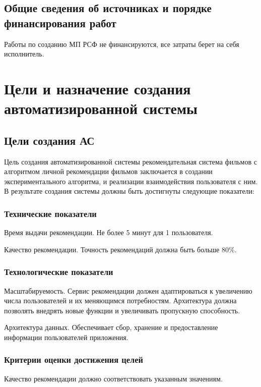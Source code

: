 \subsection{Общие сведения об источниках и порядке финансирования работ}

Работы по созданию МП РСФ не финансируются, все затраты берет на себя исполнитель.

\section{Цели и назначение создания автоматизированной системы}

\subsection{Цели создания АС}

Цель создания автоматизированной системы рекомендательная система фильмов с алгоритмом личной рекомендации фильмов
заключается в создании экспериментального алгоритма, и реализации взаимодействия пользователя с ним.
В результате создания системы должны быть достигнуты следующие показатели:

\subsubsection{Технические показатели}

Время выдачи рекомендации.
Не более 5 минут для 1 пользователя.

Качество рекомендации.
Точность рекомендаций должна быть больше 80\%.


\subsubsection{Технологические показатели}

Масштабируемость.
Сервис рекомендации должен адаптироваться к увеличению числа пользователей и их меняющимся потребностям.
Архитектура должна позволять внедрять новые функции и увеличивать пропускную способность.

Архитектура данных.
Обеспечивает сбор, хранение и предоставление информации пользователей приложения.


\subsubsection{Критерии оценки достижения целей}

Качество рекомендации должно соответствовать указанным значениям.

